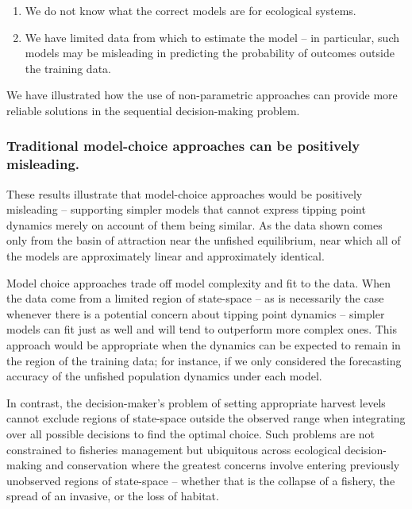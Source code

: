 \documentclass[author-year, review]{elsarticle} %
\begin{document}
\begin{enumerate}
\def\labelenumi{\arabic{enumi}.}
\itemsep1pt\parskip0pt
\item
  We do not know what the correct models are for ecological systems.
\item
  We have limited data from which to estimate the model -- in
  particular, such models may be misleading in predicting the
  probability of outcomes outside the training data.
\end{enumerate}

We have illustrated how the use of non-parametric approaches can provide
more reliable solutions in the sequential decision-making problem.

\subsubsection{Traditional model-choice approaches can be positively
misleading.}\label{traditional-model-choice-approaches-can-be-positively-misleading.}

These results illustrate that model-choice approaches would be
positively misleading -- supporting simpler models that cannot express
tipping point dynamics merely on account of them being similar. As the
data shown comes only from the basin of attraction near the unfished
equilibrium, near which all of the models are approximately linear and
approximately identical.

Model choice approaches trade off model complexity and fit to the data.
When the data come from a limited region of state-space -- as is
necessarily the case whenever there is a potential concern about tipping
point dynamics -- simpler models can fit just as well and will tend to
outperform more complex ones. This approach would be appropriate when
the dynamics can be expected to remain in the region of the training
data; for instance, if we only considered the forecasting accuracy of
the unfished population dynamics under each model.

In contrast, the decision-maker's problem of setting appropriate harvest
levels cannot exclude regions of state-space outside the observed range
when integrating over all possible decisions to find the optimal choice.
Such problems are not constrained to fisheries management but ubiquitous
across ecological decision-making and conservation where the greatest
concerns involve entering previously unobserved regions of state-space
-- whether that is the collapse of a fishery, the spread of an invasive,
or the loss of habitat.
\end{document}
